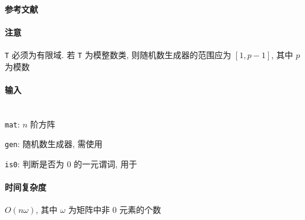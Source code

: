 \paragraph{参考文献} \cite{wiedemann1986solving}

\paragraph{注意} \verb|T| 必须为有限域. 若 \verb|T| 为模整数类, 则随机数生成器的范围应为 \([1, p-1]\), 其中 \(p\) 为模数

\paragraph{输入}~\\

\verb|mat|: \(n\) 阶方阵

\verb|gen|: 随机数生成器, 需使用 

\verb|is0|: 判断是否为 \(0\) 的一元谓词, 用于 

\paragraph{时间复杂度} \(O(n\omega)\), 其中 \(\omega\) 为矩阵中非 \(0\) 元素的个数

